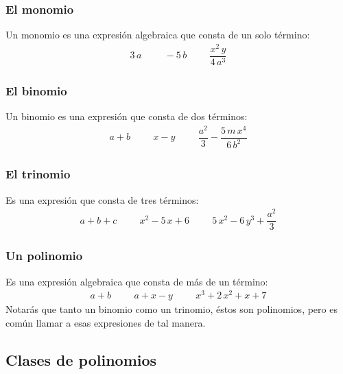 \begin{frame}
\frametitle{El monomio}
Un monomio es una expresión algebraica que consta de un solo término:
\begin{align*}
3 \, a \hspace{1cm} - 5 \, b \hspace{1cm} \dfrac{x^{2} \, y}{4 \, a^{3}}
\end{align*}
\end{frame}
\begin{frame}
\frametitle{El binomio}
Un binomio es una expresión que consta de dos términos:
\begin{align*}
a + b \hspace{1cm} x - y \hspace{1cm} \dfrac{a^{2}}{3} - \dfrac{5 \, m \, x^{4}}{6 \, b^{2}}
\end{align*}
\end{frame}
\begin{frame}
\frametitle{El trinomio}
Es una expresión que consta de tres términos:
\begin{align*}
a + b + c \hspace{1cm} x^{2} - 5 \, x + 6 \hspace{1cm} 5  \, x^{2} - 6 \, y^{3} + \dfrac{a^{2}}{3}
\end{align*}  
\end{frame}
\begin{frame}
\frametitle{Un polinomio}
Es una expresión algebraica que consta de más de un término:
\begin{align*}
a + b \hspace{1cm} a + x - y \hspace{1cm} x^{3} + 2 \, x^{2} +  x +  7
\end{align*}
\pause
Notarás que tanto un binomio como un trinomio, éstos son polinomios, pero es común llamar a esas expresiones de tal manera.
\end{frame}

\subsection{Clases de polinomios}


